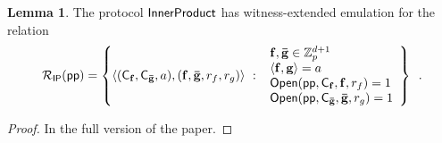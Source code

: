 \documentclass{article}
\theoremstyle{definition}
\newtheorem{lemma}{Lemma}
\begin{document}
\begin{lemma}
    The protocol $\textsf{{InnerProduct}}$ has witness-extended emulation for the relation
\[\mathcal{R}_\mathsf{IP}(\textsf{pp}) = \left\{
    \langle(\mathsf{C}_\mathbf{f}, \mathsf{C}_\mathbf{\bar{g}}, a), (\mathbf{f}, \mathbf{\bar{g}}, r_f, r_g)\rangle \ : \     \begin{array}{l}
            \mathbf{f}, \mathbf{\bar{g}} \in \mathbb{Z}_p^{d+1} \\
            \langle \mathbf{f}, \mathbf{g} \rangle = a \\
            \textsf{{Open}}(\textsf{pp}, \mathsf{C}_\mathbf{f}, \mathbf{f}, r_f) = 1 \\
            \textsf{{Open}}(\textsf{pp}, \mathsf{C}_\mathbf{\bar{g}}, \mathbf{\bar{g}}, r_g) = 1
        \end{array}
    \right\} \enspace .
\]
\end{lemma}

\begin{proof}
In the full version of the paper.
\end{proof}
\end{document}
